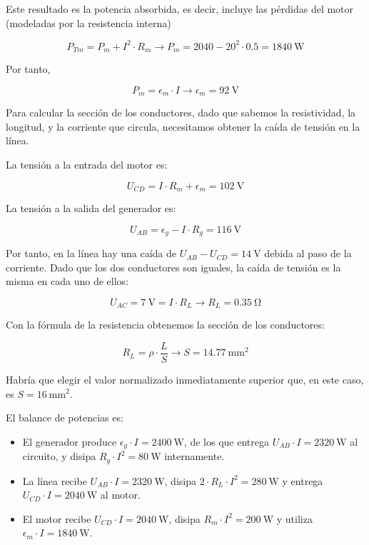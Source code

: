 \documentclass[10pt]{article}
\begin{document}
Este resultado es la potencia absorbida, es decir, incluye las pérdidas del motor (modeladas por la resistencia interna)

\[
  P_{Tm} = P_m + I^2 \cdot R_m \rightarrow P_m = 2040 - 20^2 \cdot 0.5 = \SI{1840}{\watt}
\]

Por tanto,

\[
  P_m = \epsilon_m \cdot I \rightarrow \epsilon_m = \SI{92}{\volt}
\]

Para calcular la sección de los conductores, dado que sabemos la resistividad, la longitud, y la corriente que circula, necesitamos obtener la caída de tensión en la línea.

La tensión a la entrada del motor es:

\[
  U_{CD} = I \cdot R_m + \epsilon_m = \SI{102}{\volt}
\]

La tensión a la salida del generador es:


\[
  U_{AB} = \epsilon_g - I \cdot R_g = \SI{116}{\volt}
\]

Por tanto, en la línea hay una caída de $U_{AB} - U_{CD} = \SI{14}{\volt}$ debida al paso de la corriente. Dado que los dos conductores son iguales, la caída de tensión es la misma en cada uno de ellos:

\[
  U_{AC} = \SI{7}{\volt} = I \cdot R_L \rightarrow R_L = \SI{0.35}{\ohm}
\]

Con la fórmula de la resistencia obtenemos la sección de los conductores:

\[
  R_L = \rho \cdot \frac{L}{S} \rightarrow S = \SI{14.77}{\milli\meter\squared}
\]

Habría que elegir el valor normalizado inmediatamente superior que, en este caso, es $S = \SI{16}{\milli\meter\squared}$.


El balance de potencias es:

\begin{itemize}
\item El generador produce $\epsilon_g \cdot I = \SI{2400}{\watt}$, de los que entrega $U_{AB} \cdot I = \SI{2320}{\watt}$ al circuito, y disipa $R_g \cdot I^2 = \SI{80}{\watt}$ internamente.
\item La línea recibe $U_{AB} \cdot I = \SI{2320}{\watt}$, disipa $2 \cdot R_L \cdot I^2 = \SI{280}{\watt}$ y entrega $U_{CD} \cdot I = \SI{2040}{\watt}$ al motor.
\item El motor recibe $U_{CD} \cdot I = \SI{2040}{\watt}$, disipa $R_m \cdot I^2 = \SI{200}{\watt}$ y utiliza $\epsilon_m \cdot I = \SI{1840}{\watt}$.  
\end{itemize}
\end{document}
